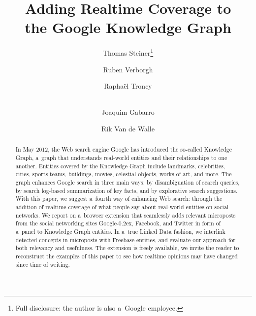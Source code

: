 \documentclass[runningheads,a4paper]{llncs}
\newcommand{\googleplus}{Google\nolinebreak\hspace{0em}\raisebox{.28ex}{\tiny\bf +}\kern-0.2ex\xspace}
\begin{document}
\title{Adding Realtime Coverage to\\the Google Knowledge Graph}

\author{Thomas Steiner\thanks{Full disclosure: the author is also a~Google employee.} \and
		Ruben Verborgh \and
		Rapha\"el Troncy \and \\
		Joaquim Gabarro \and
		Rik Van de Walle		
}


\maketitle
\setcounter{footnote}{0}

\begin{abstract}
In May 2012, the Web search engine Google has introduced the so-called Knowledge Graph,
a~graph that understands real-world entities and their relationships to one another.
Entities covered by the Knowledge Graph include landmarks, celebrities, cities, sports
teams, buildings, movies, celestial objects, works of art, and more.
The graph enhances Google search in three main ways:
by disambiguation of search queries,
by search log-based summarization of key facts,
and by explorative search suggestions.
With this paper, we suggest a~fourth way of enhancing Web search:
through the addition of realtime coverage
of what people say about real-world entities on social networks.
We report on a~browser extension that seamlessly adds relevant microposts
from the social networking sites \googleplus, Facebook, and Twitter
in form of a~panel to Knowledge Graph entities.
In a~true Linked Data fashion, we interlink detected concepts in microposts
with Freebase entities, and evaluate our approach for both relevancy and usefulness.
The extension is freely available,
we invite the reader to reconstruct the examples of this paper
to see how realtime opinions may have changed since time of writing.
\end{abstract}
\end{document}
